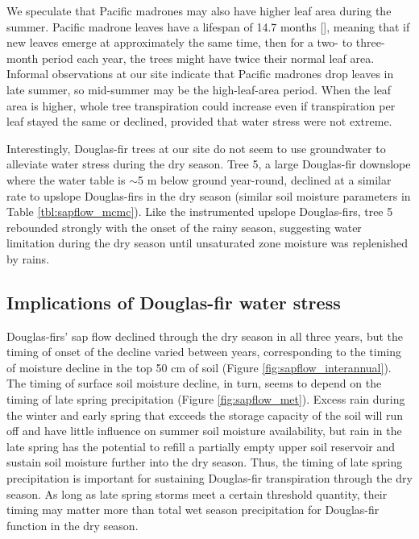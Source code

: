 We speculate that Pacific madrones may also have higher leaf area during the summer.  Pacific madrone leaves have a lifespan of 14.7 months [\cite{ackerly2004functional}], meaning that if new leaves emerge at approximately the same time, then for a two- to three-month period each year, the trees might have twice their normal leaf area.  Informal observations at our site indicate that Pacific madrones drop leaves in late summer, so mid-summer may be the high-leaf-area period.  When the leaf area is higher, whole tree transpiration could increase even if transpiration per leaf stayed the same or declined, provided that water stress were not extreme.

Interestingly, Douglas-fir trees at our site do not seem to use groundwater to alleviate water stress during the dry season.  Tree 5, a large Douglas-fir downslope where the water table is $\sim$5 m below ground year-round, declined at a similar rate to upslope Douglas-firs in the dry season (similar soil moisture parameters in Table \ref{tbl:sapflow_mcmc}).  Like the instrumented upslope Douglas-firs, tree 5 rebounded strongly with the onset of the rainy season, suggesting water limitation during the dry season until unsaturated zone moisture was replenished by rains.

\subsection{Implications of Douglas-fir water stress}
Douglas-firs' sap flow declined through the dry season in all three years, but the timing of onset of the decline varied between years, corresponding to the timing of moisture decline in the top 50 cm of soil (Figure \ref{fig:sapflow_interannual}).  The timing of surface soil moisture decline, in turn, seems to depend on the timing of late spring precipitation (Figure \ref{fig:sapflow_met}).  Excess rain during the winter and early spring that exceeds the storage capacity of the soil will run off and have little influence on summer soil moisture availability, but rain in the late spring has the potential to refill a partially empty upper soil reservoir and sustain soil moisture further into the dry season.  Thus, the timing of late spring precipitation is important for sustaining Douglas-fir transpiration through the dry season.  As long as late spring storms meet a certain threshold quantity, their timing may matter more than total wet season precipitation for Douglas-fir function in the dry season.


